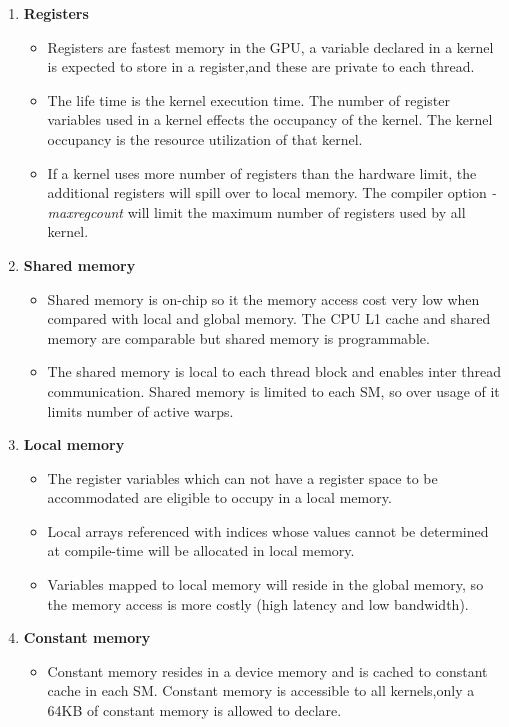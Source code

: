 \begin{enumerate}
\enlargethispage{-\baselineskip}
\item \textbf{Registers}
\begin{itemize}
\item Registers are fastest memory in the GPU, a variable declared in a kernel is expected to store in a register,and these are private to each thread.
\item The life time is the kernel execution time. The number of register variables used in a kernel effects the occupancy of the kernel. The kernel occupancy is the resource utilization of that kernel.
\item  If a kernel uses more number of registers than the hardware limit, the additional registers will spill over to local memory. The compiler option \textit{-maxregcount} will limit the maximum number of registers used by all kernel.
\end{itemize} 
\item \textbf{Shared memory}
\begin{itemize}
\item Shared memory is on-chip so it the memory access cost very low when compared with local and global memory. The CPU L1 cache and shared memory are comparable but shared memory is programmable.
\item The shared memory is local to each thread block and enables inter thread communication. Shared memory is limited to each SM, so over usage of it limits number of active warps.
\end{itemize}
\item \textbf{Local memory}
\begin{itemize}
\item The register variables which can not have a register space to be accommodated are eligible to occupy in a local memory.
\item Local arrays referenced with indices whose values cannot be determined at compile-time will be allocated in local memory.
\item Variables mapped to local memory will reside in the global memory, so the memory access is more costly (high latency and low bandwidth).
\end{itemize}
\item \textbf{Constant memory}
\begin{itemize}
\item Constant memory resides in a device memory and is cached to constant cache in each SM. Constant memory is accessible to all kernels,only a 64KB of constant memory is allowed to declare.

\end{itemize}
\end{enumerate}
